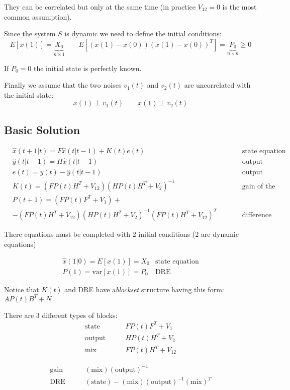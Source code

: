 They can be correlated but only at the same time (in practice $V_{12}=0$ is the most common assumption).

Since the system $S$ is dynamic we need to define the initial conditions:
\[
    E[x(1)] = \underbrace{X_0}_{n\times 1} \qquad E[\left(x(1) - x(0)\right)\left(x(1)-x(0)\right)^T] = \underbrace{P_0}_{n\times n} \ge 0
\]

If $P_0 = 0$ the initial state is perfectly known.

Finally we assume that the two noises $v_1(t)$ and $v_2(t)$ are uncorrelated with the initial state:
\[
    x(1) \perp v_1(t) \qquad x(1) \perp v_2(t)
\]

\subsection{Basic Solution}

\begin{align*}
    & \hat{x}(t+1|t) = F\hat{x}(t|t-1) + K(t)e(t) && \qquad \text{state equation} \\
    & \hat{y}(t|t-1) = H\hat{x}(t|t-1) &&\qquad \text{output equation} \\
    & e(t) = y(t) - \hat{y}(t|t-1) &&\qquad \text{output prediction error} \\
    & K(t) = \left( FP(t)H^T+V_{12} \right) \left( HP(t)H^T+V_2 \right)^{-1} &&\qquad \text{gain of the K.F.} \\
    & P(t+1) = \left( FP(t)F^T + V_1 \right) + &&\\
    & - \left( FP(t)H^T + V_{12} \right)\left( HP(t)H^T + V_{2} \right)^{-1}\left( FP(t)H^T + V_{12} \right)^T && \qquad\text{difference Riccati equation}
\end{align*}

There equations must be completed with 2 initial conditions (2 are dynamic equations)

\begin{align*}
    \hat{x}(1|0) = E[x(1)] = X_0 & \text{state equation} \\
    P(1) = \text{var}[x(1)] = P_0 & \text{DRE}
\end{align*}

\begin{remark}
    Notice that $K(t)$ and DRE have  a\emph{blockset} structure having this form: $AP(t)B^T+N$

    There are 3 different types of blocks:
    \begin{align*}
        \text{state} \qquad& FP(t)F^T+V_1 \\
        \text{output} \qquad& HP(t)H^T+V_2 \\
        \text{mix} \qquad& FP(t)H^T+V_{12}
    \end{align*}

    \begin{align*}
        \text{gain} \qquad& (\text{mix})(\text{output})^{-1} \\
        \text{DRE} \qquad& (\text{state}) - (\text{mix})(\text{output})^{-1}(\text{mix})^T
    \end{align*}
\end{remark}

